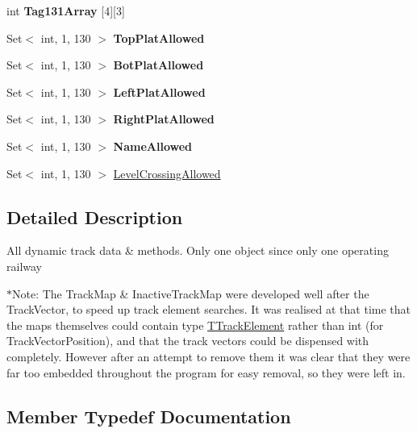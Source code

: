 \begin{DoxyCompactItemize}
\item 
\mbox{\label{class_t_track_aff5c466da1dda0b20e1f770253ad2813}} 
int {\bfseries Tag131\+Array} \mbox{[}4\mbox{]}\mbox{[}3\mbox{]}
\item 
\mbox{\label{class_t_track_aebfb764fdd1bddb8f82b943e5af9979b}} 
Set$<$ int, 1, 130 $>$ {\bfseries Top\+Plat\+Allowed}
\item 
\mbox{\label{class_t_track_a0b2e23790782af830a0b206dcb9d9469}} 
Set$<$ int, 1, 130 $>$ {\bfseries Bot\+Plat\+Allowed}
\item 
\mbox{\label{class_t_track_a70fcf10b4a31240e4d103d04e7116926}} 
Set$<$ int, 1, 130 $>$ {\bfseries Left\+Plat\+Allowed}
\item 
\mbox{\label{class_t_track_a1cde503d01659ec96a735529aca8efcb}} 
Set$<$ int, 1, 130 $>$ {\bfseries Right\+Plat\+Allowed}
\item 
\mbox{\label{class_t_track_a44c0c3df5931635e578bfd17d51ecd31}} 
Set$<$ int, 1, 130 $>$ {\bfseries Name\+Allowed}
\item 
Set$<$ int, 1, 130 $>$ \mbox{\hyperlink{class_t_track_a29617e6f88e44a7974dc08a371682d0b}{Level\+Crossing\+Allowed}}
\end{DoxyCompactItemize}


\subsection{Detailed Description}
All dynamic track data \& methods. Only one object since only one operating railway

$\ast$\+Note\+: The Track\+Map \& Inactive\+Track\+Map were developed well after the Track\+Vector, to speed up track element searches. It was realised at that time that the maps themselves could contain type \mbox{\hyperlink{class_t_track_element}{T\+Track\+Element}} rather than int (for Track\+Vector\+Position), and that the track vectors could be dispensed with completely. However after an attempt to remove them it was clear that they were far too embedded throughout the program for easy removal, so they were left in. 

\subsection{Member Typedef Documentation}
\mbox{\label{class_t_track_af124e944cfb44075f390cf5eceaf3e66}} 
